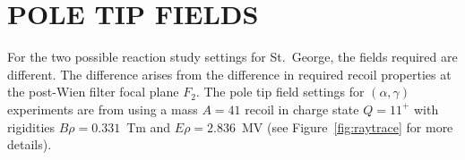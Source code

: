 \chapter{POLE TIP FIELDS}

For the two possible reaction study settings for St.\ George, the fields
required are different. The difference arises from the difference in
required recoil properties at the post-Wien filter focal plane $F_2$.
The pole tip field settings for $(\alpha,\gamma)$ experiments are from
using a mass $A = 41$ recoil in charge state $Q = 11^+$ with rigidities
$B\rho = 0.331$~Tm and $E\rho = 2.836$~MV (see Figure~\ref{fig:raytrace}
for more details).
